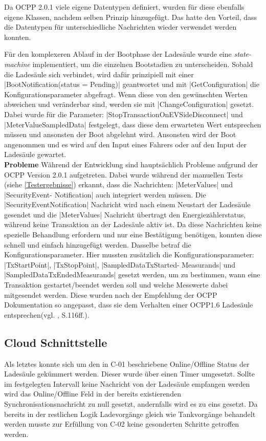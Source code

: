 \noindent Da OCPP 2.0.1 viele eigene Datentypen definiert, wurden für diese ebenfalls eigene Klassen, nachdem selben Prinzip hinzugefügt. Das hatte den Vorteil, dass die Datentypen für unterschiedliche Nachrichten wieder verwendet werden konnten.\newline

\noindent Für den komplexeren Ablauf in der Bootphase der Ladesäule wurde eine \textit{state-machine} implementiert, um die einzelnen Bootstadien zu unterscheiden. Sobald die Ladesäule sich verbindet, wird dafür prinzipiell mit einer \spverb|BootNotification(status = Pending)| geantwortet und mit \spverb|GetConfiguration| die Konfigurationsparameter abgefragt. Wenn diese von den gewünschten Werten abweichen und veränderbar sind, werden sie mit \spverb|ChangeConfiguration| gesetzt. Dabei wurde für die Parameter: \spverb|StopTransactionOnEVSideDisconnect| und \spverb|MeterValueSampledData| festgelegt, dass diese dem erwarteten Wert entsprechen müssen und ansonsten der Boot abgelehnt wird. Ansonsten wird der Boot angenommen und es wird auf den Input eines Fahrers oder auf den Input der Ladesäule gewartet. \\

\noindent \textbf{Probleme}\newline
\noindent Während der Entwicklung sind hauptsächlich Probleme aufgrund der OCPP Version 2.0.1 aufgetreten. Dabei wurde während der manuellen Tests (siehe \autoref{Testergebnisse}) erkannt, dass die Nachrichten: \spverb|MeterValues| und \spverb|SecurityEvent- Notification| auch integriert werden müssen. Die \spverb|SecurityEventNotification| Nachricht wird nach einem Neustart der Ladesäule gesendet und die \spverb|MeterValues| Nachricht übertragt den Energiezählerstatus, während keine Transaktion an der Ladesäule aktiv ist. Da diese Nachrichten keine spezielle Behandlung erfordern und nur eine Bestätigung benötigen, konnten diese schnell und einfach hinzugefügt werden. Dasselbe betraf die Konfigurationsparameter. Hier mussten zusätzlich die Konfigurationsparameter: \spverb|TxStartPoint|, \spverb|TxStopPoint|, \spverb|SampledDataTxStarted- Measurands| und \spverb|SampledDataTxEndedMeasurands| gesetzt werden, um zu bestimmen, wann eine Transaktion gestartet/beendet werden soll und welche Messwerte dabei mitgesendet werden. Diese wurden nach der Empfehlung der OCPP Dokumentation so angepasst, dass sie dem Verhalten einer OCPP1.6 Ladesäule entsprechen(vgl. \cite{OCPP-2.0.1-part2-specification-edition2}, S.116ff.).
\subsection{Cloud Schnittstelle}
Als letztes konnte sich um den in C-01 beschriebene Online/Offline Status der Ladesäule gekümmert werden. Dieser wurde über einen Timer umgesetzt. Sollte im festgelegten Intervall keine Nachricht von der Ladesäule empfangen werden wird das Online/Offline Feld in der bereits existierenden Synchronisationsnachricht zu null gesetzt, andernfalls wird es zu eins gesetzt.\newline
\noindent Da bereits in der restlichen Logik Ladevorgänge gleich wie Tankvorgänge behandelt werden musste zur Erfüllung von C-02 keine gesonderten Schritte getroffen werden.
